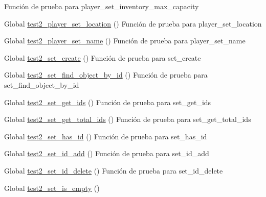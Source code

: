 \begin{DoxyRefList}
%
Función de prueba para player\+\_\+set\+\_\+inventory\+\_\+max\+\_\+capacity  
\item[Global \mbox{\hyperlink{player__test_8c_a2c702753d9e2e3df9ef4abf2d1b9bc8d}{test2\+\_\+player\+\_\+set\+\_\+location}} ()]\label{test__test000194}%
%
Función de prueba para player\+\_\+set\+\_\+location  
\item[Global \mbox{\hyperlink{player__test_8c_a6e7ce8ff791f4bf63749df647a44263f}{test2\+\_\+player\+\_\+set\+\_\+name}} ()]\label{test__test000178}%
%
Función de prueba para player\+\_\+set\+\_\+name  
\item[Global \mbox{\hyperlink{set__test_8c_abed3d273788e23fc31ae7f5ed59277b9}{test2\+\_\+set\+\_\+create}} ()]\label{test__test000210}%
%
Función de prueba para set\+\_\+create  
\item[Global \mbox{\hyperlink{set__test_8c_a5ab7b30d4a8ea609094642ab4b8608ee}{test2\+\_\+set\+\_\+find\+\_\+object\+\_\+by\+\_\+id}} ()]\label{test__test000229}%
%
Función de prueba para set\+\_\+find\+\_\+object\+\_\+by\+\_\+id  
\item[Global \mbox{\hyperlink{set__test_8c_aafec36ceb79db74e67643606bf07c401}{test2\+\_\+set\+\_\+get\+\_\+ids}} ()]\label{test__test000243}%
%
Función de prueba para set\+\_\+get\+\_\+ids  
\item[Global \mbox{\hyperlink{set__test_8c_a236ec2fe04b7272edab3005a73404830}{test2\+\_\+set\+\_\+get\+\_\+total\+\_\+ids}} ()]\label{test__test000223}%
%
Función de prueba para set\+\_\+get\+\_\+total\+\_\+ids  
\item[Global \mbox{\hyperlink{set__test_8c_a27ba936110dfc23be0d0d3b9ebf07161}{test2\+\_\+set\+\_\+has\+\_\+id}} ()]\label{test__test000225}%
%
Función de prueba para set\+\_\+has\+\_\+id  
\item[Global \mbox{\hyperlink{set__test_8c_ab6a9210f22d3234e027415888c419929}{test2\+\_\+set\+\_\+id\+\_\+add}} ()]\label{test__test000212}%
%
Función de prueba para set\+\_\+id\+\_\+add  
\item[Global \mbox{\hyperlink{set__test_8c_abb2dadbaf2b7704c5a688fa9fcd5b58f}{test2\+\_\+set\+\_\+id\+\_\+delete}} ()]\label{test__test000216}%
%
Función de prueba para set\+\_\+id\+\_\+delete  
\item[Global \mbox{\hyperlink{set__test_8c_a13000e62535d3341e070963f4f3907ec}{test2\+\_\+set\+\_\+is\+\_\+empty}} ()]\label{test__test000233}%

\end{DoxyRefList}
